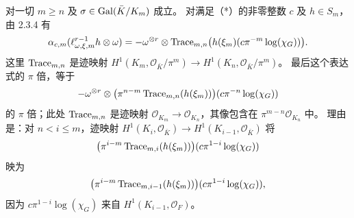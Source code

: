 对一切 $m\geq n$ 及 $\sigma\in\operatorname{Gal}(\bar K/K_m)$ 成立。
对满足（*）的非零整数 $c$ 及 $h\in S_m$，由 2.3.4 有
\[
\alpha_{c,m}(\ell_{\omega,\xi,m}^{r-1}h\otimes\omega)
=-\omega^{\otimes r}\otimes\operatorname{Trace}_{m,n}
\bigl(h(\xi_m)(c\pi^{-m}\log(\chi_G))\bigr).
\]
这里 $\operatorname{Trace}_{m,n}$ 是迹映射
$H^1(K_m,\mathcal O_{\bar K}/\pi^m)\to H^1(K_n,\mathcal O_{\bar K}/\pi^m)$。
最后这个表达式的 $\pi$ 倍，等于
\[
-\omega^{\otimes r}\otimes
\bigl(\pi^{n-m}\operatorname{Trace}_{m,n}(h(\xi_m))\bigr)(c\pi^{-n}\log(\chi_G))
\]
的 $\pi$ 倍；此处 $\operatorname{Trace}_{m,n}$ 是迹映射
$\mathcal O_{K_m}\to\mathcal O_{K_n}$，其像包含在 $\pi^{m-n}\mathcal O_{K_n}$ 中。
理由是：对 $n<i\leq m$，迹映射
$H^1(K_i,\mathcal O_{\bar K})\to H^1(K_{i-1},\mathcal O_{\bar K})$
将
\[
\bigl(\pi^{i-m}\operatorname{Trace}_{m,i}(h(\xi_m))\bigr)(c\pi^{1-i}\log(\chi_G))
\]
映为
\[
\bigl(\pi^{i-m}\operatorname{Trace}_{m,i-1}(h(\xi_m))\bigr)(c\pi^{1-i}\log(\chi_G)),
\]
因为 $c\pi^{1-i}\log(\chi_G)$ 来自 $H^1(K_{i-1},\mathcal O_F)$。

